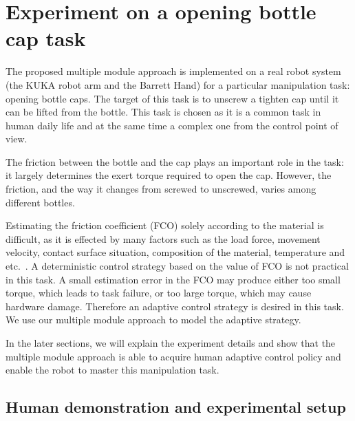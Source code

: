 \section{Experiment on a opening bottle cap task}
\label{cha4:sec3}

The proposed multiple module approach is implemented on a real robot system (the KUKA robot arm and the Barrett Hand) for a particular manipulation task: opening bottle caps. The target of this task is to unscrew a tighten cap until it can be lifted from the bottle.
This task is chosen as it is a common task in human daily life and at the same time a complex one from the control point of view.

The friction between the bottle and the cap plays an important role in the task: it largely determines the exert torque required to open the cap. However, the friction, and the way it changes from screwed to unscrewed, varies among different bottles.

Estimating the friction coefficient (FCO) solely according to the material is difficult, as it is effected by many factors such as the load force, movement velocity, contact surface situation, composition of the material, temperature and etc.~\cite{gustafssoninvestigation}. A deterministic control strategy based on the value of FCO is not practical in this task. A small estimation error in the FCO may produce either too small torque, which leads to task failure, or too large torque, which may cause hardware damage. Therefore an adaptive control strategy is desired in this task. %
We use our multiple module approach to model the adaptive strategy.

In the later sections, we will explain the experiment details and show that the multiple module approach is able to acquire human adaptive control policy and enable the robot to master this manipulation task.




\subsection{Human demonstration and experimental setup}
\label{cha4:sec3:experimentsetup}

